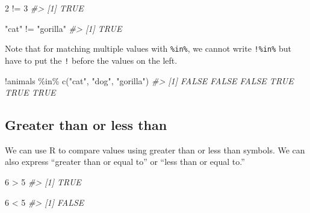 \documentclass[
]{krantz}
\makeatletter
\newenvironment{Shaded}{\begin{snugshade}}{\end{snugshade}}
\newcommand{\CommentTok}[1]{\textcolor[rgb]{0.37,0.37,0.37}{\textit{#1}}}
\newcommand{\DecValTok}[1]{\textcolor[rgb]{0.06,0.06,0.06}{#1}}
\newcommand{\FunctionTok}[1]{\textcolor[rgb]{0,0,0}{#1}}
\newcommand{\NormalTok}[1]{#1}
\newcommand{\SpecialCharTok}[1]{\textcolor[rgb]{0,0,0}{#1}}
\newcommand{\StringTok}[1]{\textcolor[rgb]{0.5,0.5,0.5}{#1}}
\newenvironment{kframe}{%
\medskip{}
\setlength{\fboxsep}{.8em}
 \def\at@end@of@kframe{}%
 \ifinner\ifhmode%
  \def\at@end@of@kframe{\end{minipage}}%
  \begin{minipage}{\columnwidth}%
 \fi\fi%
 \def\FrameCommand##1{\hskip\@totalleftmargin \hskip-\fboxsep
 \colorbox{shadecolor}{##1}\hskip-\fboxsep
     \hskip-\linewidth \hskip-\@totalleftmargin \hskip\columnwidth}%
 \MakeFramed {\advance\hsize-\width
   \@totalleftmargin\z@ \linewidth\hsize
   \@setminipage}}%
 {\par\unskip\endMakeFramed%
 \at@end@of@kframe}
\renewenvironment{Shaded}{\begin{kframe}}{\end{kframe}}
\makeatother
\begin{document}
\begin{Shaded}
\begin{Highlighting}[]
\DecValTok{2} \SpecialCharTok{!=} \DecValTok{3}
\CommentTok{\#\textgreater{} [1] TRUE}
\end{Highlighting}
\end{Shaded}

\begin{Shaded}
\begin{Highlighting}[]
\StringTok{"cat"} \SpecialCharTok{!=} \StringTok{"gorilla"}
\CommentTok{\#\textgreater{} [1] TRUE}
\end{Highlighting}
\end{Shaded}

Note that for matching multiple values with \texttt{\%in\%}, we cannot write \texttt{!\%in\%} but have to put the \texttt{!} before the values on the left.

\begin{Shaded}
\begin{Highlighting}[]
\SpecialCharTok{!}\NormalTok{animals }\SpecialCharTok{\%in\%} \FunctionTok{c}\NormalTok{(}\StringTok{"cat"}\NormalTok{, }\StringTok{"dog"}\NormalTok{, }\StringTok{"gorilla"}\NormalTok{)}
\CommentTok{\#\textgreater{} [1] FALSE FALSE FALSE  TRUE  TRUE  TRUE}
\end{Highlighting}
\end{Shaded}

\hypertarget{greater-than-or-less-than}{%
\subsection{Greater than or less than}\label{greater-than-or-less-than}}

We can use R to compare values using greater than or less than symbols. We can also express ``greater than or equal to'' or ``less than or equal to.''

\begin{Shaded}
\begin{Highlighting}[]
\DecValTok{6} \SpecialCharTok{\textgreater{}} \DecValTok{5}
\CommentTok{\#\textgreater{} [1] TRUE}
\end{Highlighting}
\end{Shaded}

\begin{Shaded}
\begin{Highlighting}[]
\DecValTok{6} \SpecialCharTok{\textless{}} \DecValTok{5}
\CommentTok{\#\textgreater{} [1] FALSE}
\end{Highlighting}
\end{Shaded}
\end{document}
